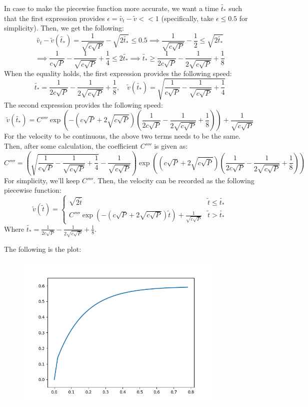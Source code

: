 \documentclass{article}
\begin{document}
In case to make the piecewise function more accurate, we want a time $\tilde{t_*}$ such that the first expression provides $\epsilon = \tilde{v_t}-\tilde{v}<<1$ (specifically, take $\epsilon\leq 0.5$ for simplicity). Then, we get the following:
$$\tilde{v_t}-\tilde{v}(\tilde{t_*}) = \frac{1}{\sqrt{c\sqrt{P}}}-\sqrt{2\tilde{t_*}}\leq 0.5 \implies \frac{1}{\sqrt{c\sqrt{P}}}-\frac{1}{2}\leq \sqrt{2\tilde{t_*}}$$
$$\implies \frac{1}{c\sqrt{P}}-\frac{1}{\sqrt{c\sqrt{P}}}+\frac{1}{4}\leq 2\tilde{t_*} \implies \tilde{t_*}\geq \frac{1}{2c\sqrt{P}}-\frac{1}{2\sqrt{c\sqrt{P}}}+\frac{1}{8}$$
When the equality holds, the first expression provides the following speed:
$$\tilde{t_*}=\frac{1}{2c\sqrt{P}}-\frac{1}{2\sqrt{c\sqrt{P}}}+\frac{1}{8},\quad \tilde{v}(\tilde{t_*}) = \sqrt{\frac{1}{c\sqrt{P}}-\frac{1}{\sqrt{c\sqrt{P}}}+\frac{1}{4}}$$
The second expression provides the following speed:
$$\tilde{v}(\tilde{t_*})=C''''\exp\left(-\left(c\sqrt{P}+2\sqrt{c\sqrt{P}}\right)\left(\frac{1}{2c\sqrt{P}}-\frac{1}{2\sqrt{c\sqrt{P}}}+\frac{1}{8}\right)\right) + \frac{1}{\sqrt{c\sqrt{P}}}$$
For the velocity to be continuous, the above two terms needs to be the same. Then, after some calculation, the coefficient $C''''$ is given as:
$$C'''' = \left(\sqrt{\frac{1}{c\sqrt{P}}-\frac{1}{\sqrt{c\sqrt{P}}}+\frac{1}{4}}-\frac{1}{\sqrt{c\sqrt{P}}}\right)\exp\left(\left(c\sqrt{P}+2\sqrt{c\sqrt{P}}\right)\left(\frac{1}{2c\sqrt{P}}-\frac{1}{2\sqrt{c\sqrt{P}}}+\frac{1}{8}\right)\right)$$
For simplicity, we'll keep $C''''$. Then, the velocity can be recorded as the following piecewise function:
$$\tilde{v}(\tilde{t}) = \begin{cases}
    \sqrt{2\tilde{t}} & \tilde{t}\leq \tilde{t_*}\\
    C''''\exp\left(-\left(c\sqrt{P}+2\sqrt{c\sqrt{P}}\right)\tilde{t}\right)+\frac{1}{\sqrt{c\sqrt{P}}} & \tilde{t}>\tilde{t_*}
\end{cases}$$
Where $\tilde{t_*} = \frac{1}{2c\sqrt{P}}-\frac{1}{2\sqrt{c\sqrt{P}}}+\frac{1}{8}$.

\hfil

The following is the plot:
\begin{figure}[h!]
    \begin{center}
        \includegraphics[width=100mm]{Figure_1.png}
    \end{center}
\end{figure}
\end{document}

